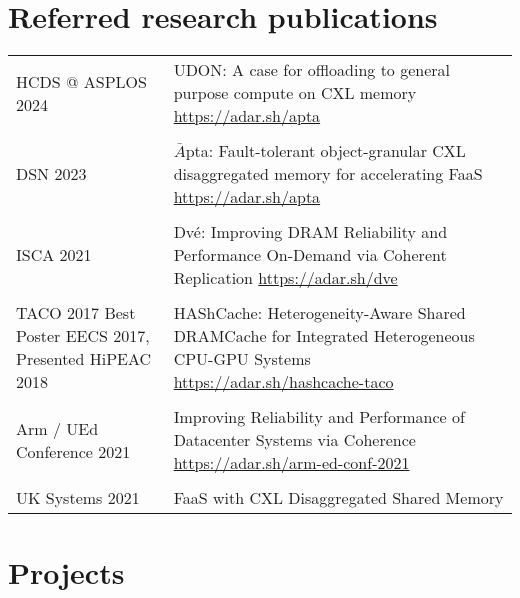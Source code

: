 \documentclass[a4paper,10pt]{article} %
\begin{document}
\section{Referred research publications}
\begin{tabular}{p{3cm}p{11cm}}
HCDS @ ASPLOS 2024 &  UDON: A case for offloading to general purpose compute on CXL memory \hfill \href{https://adar.sh/apta}{https://adar.sh/apta}\\
& \\
DSN 2023 &  $\bar{A}$pta: Fault-tolerant object-granular CXL disaggregated memory for \newline accelerating FaaS \hfill \href{https://adar.sh/apta}{https://adar.sh/apta}\\
& \\
ISCA 2021 & Dv\'e: Improving DRAM Reliability and Performance On-Demand via \newline Coherent Replication \hfill  \href{https://adar.sh/dve}{https://adar.sh/dve}\\
&\\
TACO 2017 \newline \footnotesize{Best Poster EECS 2017, Presented HiPEAC 2018} & HAShCache: Heterogeneity-Aware Shared DRAMCache for Integrated Heterogeneous CPU-GPU Systems  \hfill
\href{https://adar.sh/hashcache-taco}{https://adar.sh/hashcache-taco}\\
&\\
Arm / UEd Conference 2021 & Improving Reliability and Performance of Datacenter Systems via \newline Coherence \hfill  \href{https://adar.sh/arm-ed-conf-2021}{https://adar.sh/arm-ed-conf-2021}\\	
&\\
UK Systems 2021 & FaaS with CXL Disaggregated Shared Memory
\end{tabular}

\vspace{0.05in}

\section{Projects}
\end{document}
